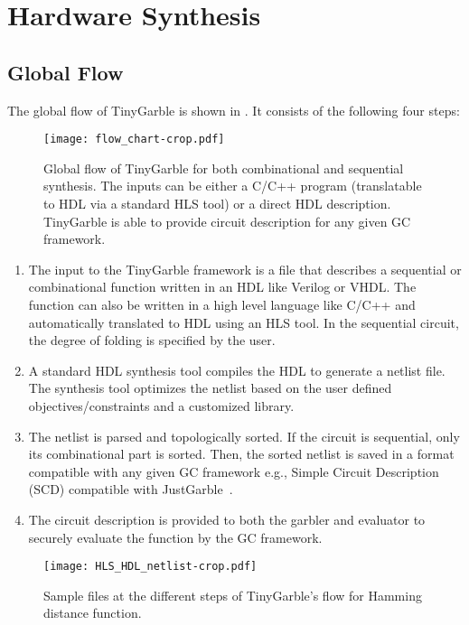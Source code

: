 \chapter{Hardware Synthesis}
\section{Global Flow}
The global flow of TinyGarble is shown in .
It consists of the following four steps:

\begin{figure*}
\centering
\texttt{[image: flow\_chart-crop.pdf]}
\caption{Global flow of TinyGarble for both combinational and sequential synthesis.
  The inputs can be either a C/C++ program (translatable to HDL via a standard HLS tool) or a direct HDL description.
  TinyGarble is able to provide circuit description for any given GC framework.}
\label{fig:globalflow}
\end{figure*}

\begin{enumerate}
\item
  The input to the TinyGarble framework is a file that describes a sequential or combinational function written in an HDL like Verilog or VHDL.
  The function can also be written in a high level language like C/C++ and automatically translated to HDL using an HLS tool.
  In the sequential circuit, the degree of folding is specified by the user.

\item
  A standard HDL synthesis tool compiles the HDL to generate a netlist file.
  The synthesis tool optimizes the netlist based on the user defined objectives/constraints and a customized library.

\item
  The netlist is parsed and topologically sorted.
  If the circuit is sequential, only its combinational part is sorted.
  Then, the sorted netlist is saved in a format compatible with any given GC framework e.g., Simple Circuit Description (SCD) compatible with JustGarble~\cite{bellare2013efficient}.

\item
  The circuit description is provided to both the garbler and evaluator to securely evaluate the function by the GC framework.
\end{enumerate}

\begin{figure*}
\centering
\texttt{[image: HLS\_HDL\_netlist-crop.pdf]}
\caption{Sample files at the different steps of TinyGarble's flow for Hamming distance function.}
\label{fig:globalflow_sample}
\end{figure*}

